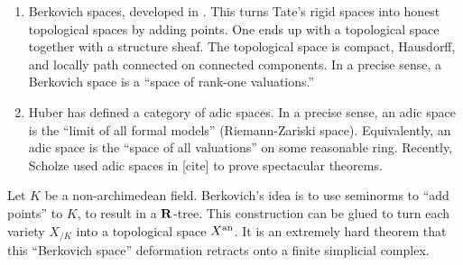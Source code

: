\documentclass[oneside]{article}
\begin{document}
\begin{enumerate}
\item Berkovich spaces, developed in \cite{berkovich-1990}. This turns Tate's 
rigid spaces into honest topological spaces by adding points. One ends up with 
a topological space together with a structure sheaf. The topological space is 
compact, Hausdorff, and locally path connected on connected components. In a 
precise sense, a Berkovich space is a ``space of rank-one valuations.'' 

\item Huber has defined a category of adic spaces. In a precise sense, an adic 
space is the ``limit of all formal models'' (Riemann-Zariski space). 
Equivalently, an adic space is the ``space of all valuations'' on some 
reasonable ring. Recently, Scholze used adic spaces in [cite] to prove 
spectacular theorems. 
\end{enumerate}

Let $K$ be a non-archimedean field. Berkovich's idea is to use seminorms 
to ``add points'' to $K$, to result in a $\mathbf{R}$-tree. This construction 
can be glued to turn each variety $X_{/K}$ into a topological space 
$X^{\mathrm{an}}$. It is an extremely 
hard theorem that this ``Berkovich space'' deformation retracts onto a 
finite simplicial complex. 






\end{document}

